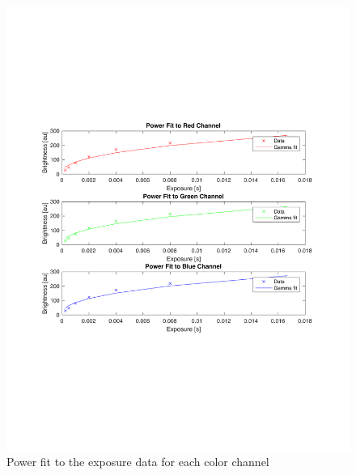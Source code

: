 \documentclass[a4paper]{article}
\begin{document}
\begin{figure}[htb!]
    \begin{center}
        \includegraphics[width=6 in]{powerfit.pdf}
	 \end{center}
    \caption{Power fit to the exposure data for each color channel} 
    \label{fig:powerfit}
\end{figure}
\end{document}
